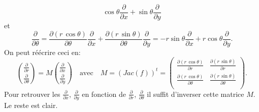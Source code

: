 {{$$\cos  \theta \frac{\partial }{\partial x} + \sin \theta \frac{\partial }{\partial y}$$
et
$$\frac{\partial }{\partial \theta}= \frac{\partial (r\, \cos \theta)}{\partial \theta}\frac{\partial }{\partial x}+
\frac{\partial (r\, \sin \theta)}{\partial \theta}\frac{\partial }{\partial y}=
-r\sin  \theta \frac{\partial }{\partial x} + r \cos \theta \frac{\partial }{\partial y}.$$
On peut r\'e\'ecrire ceci en:
$$\binom{\frac{\partial }{\partial r}}{\frac{\partial }{\partial \theta}}=M \binom{\frac{\partial }{\partial x}}{\frac{\partial }{\partial y}}
\quad \text{avec} \quad M= (Jac(f))^t = \left(
                                   \begin{array}{cc}
                                     \frac{\partial (r\, \cos \theta)}{\partial r} & \frac{\partial (r\, \sin \theta)}{\partial r} \\
                                     \frac{\partial (r\, \cos \theta)}{\partial \theta} & \frac{\partial (r\, \sin \theta)}{\partial \theta} \\
                                   \end{array}
                                 \right) .$$
Pour retrouver les $\frac{\partial }{\partial x}$, $\frac{\partial }{\partial y}$ en fonction de $\frac{\partial }{\partial r}$, $\frac{\partial }{\partial \theta}$
il suffit d'inverser cette matrice $M$. Le reste est clair.
}
}
